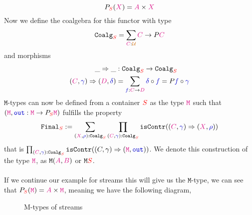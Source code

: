\documentclass[twoside,11pt,openright]{report}
\newcommand*{\term}[1]{\textcolor{blue!80!black}{#1}}
\newcommand*{\type}[1]{\textcolor{magenta!90!black}{#1}}
\newcommand*{\container}[1]{\textcolor{red}{#1}}
\newcommand*{\universe}[1]{\textcolor{orange!80!black}{#1}}
\begin{document}
\begin{equation}
  P_{\container{S}}(\type{X}) = \type{A} \times \type{X}
\end{equation}
Now we define the coalgebra for this functor with type
\begin{equation}
  \mathtt{Coalg}_{\container{S}} = \sum_{\type{C} : \universe{\mathcal{U}}} \type{C} \rightarrow P\type{C}
\end{equation}
and morphisms
\begin{equation}
  \begin{aligned}
    \_\Rightarrow\_ &: \mathtt{Coalg}_{\container{S}} \rightarrow \mathtt{Coalg}_{\container{S}} \\
    (\type{C},\term{\gamma}) \Rightarrow (\type{D},\term{\delta}) &= \sum_{\term{f} : \type{C} \rightarrow \type{D}} \term{\delta} \circ \term{f} = P \term{f} \circ \term{\gamma}
  \end{aligned}
\end{equation}
\(\mathtt{M}\)-types can now be defined from a container \(\container{S}\) as the type \(\type{\mathtt{M}}\) such that \((\type{\mathtt{M}},\term{\mathtt{out}} : \type{\mathtt{M}} \rightarrow P_{\container{S}}\type{\mathtt{M}})\) fulfills the property
\begin{equation}
  \mathtt{Final}_{\container{S}} := \sum_{(\type{X},\term{\rho}) : \mathtt{Coalg}_{\container{S}}} \prod_{{(\type{C},\term{\term{\gamma}}) : \mathtt{Coalg}_{\container{S}}}} \mathtt{isContr}((\type{C},\term{\gamma}) \Rightarrow (\type{X},\term{\rho}))
\end{equation}
that is \(\prod_{(\type{C},\term{\gamma}) : \mathtt{Coalg}_{\container{S}}} \mathtt{isContr}((C,\gamma) \Rightarrow (\type{\mathtt{M}},\term{\mathtt{out}}))\). We denote this construction of the type \(\type{\texttt{M}}\), as \(\texttt{M}(\type{A},\type{B})\) or \(\texttt{M}\container{S}\).
\\ \\
If we continue our example for streams this will give us the \(\mathtt{M}\)-type, we can see that \(P_{\container{S}}(\type{\mathtt{M}}) = \type{A} \times \type{\mathtt{M}}\), meaning we have the following diagram,
\begin{figure}[h]
  \centering
  \caption{M-types of streams}
\end{figure}
\end{document}
